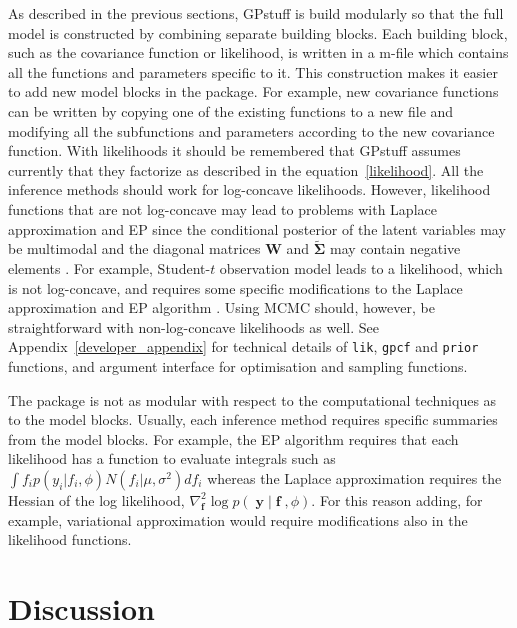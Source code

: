 \documentclass[twoside,11pt]{article}
\DeclareMathOperator{\f}{\mathbf{f}}
\DeclareMathOperator{\y}{\mathbf{y}}
\newcommand{\mb}{\mathbf}
\newcommand{\pkg}[1]{{\fontseries{b}\selectfont #1}}
\newcommand{\code}[1]{{\normalfont\texttt{#1}}}
\begin{document}
As described in the previous sections, \pkg{GPstuff} is build
modularly so that the full model is constructed by combining separate
building blocks. Each building block, such as the covariance function
or likelihood, is written in a m-file which contains
all the functions and parameters specific to it. This construction
makes it easier to add new model blocks in the package. For example, new
covariance functions can be written by copying one of the existing
functions to a new file and modifying all the subfunctions and
parameters according to the new covariance function. With likelihoods
it should be remembered that \pkg{GPstuff} assumes currently that they
factorize as described in the equation~\eqref{likelihood}. All the
inference methods should work for log-concave likelihoods. However,
likelihood functions that are not log-concave may lead to problems
with Laplace approximation and EP since the conditional posterior of
the latent variables may be multimodal and the diagonal matrices
$\mb{W}$ and $\tilde{\mb{\Sigma}}$ may contain negative elements
\citep{Vanhatalo+Jylanki+Vehtari:2009}. For example, Student-$t$
observation model leads to a likelihood, which is not log-concave, and
requires some specific modifications to the Laplace approximation and
EP algorithm \citep[see][]{Jylanki+Vanhatalo+Vehtari:2011}. Using MCMC
should, however, be straightforward with non-log-concave likelihoods
as well. 
%
See Appendix~\ref{developer_appendix} for technical details of
\code{lik}, \code{gpcf} and \code{prior} functions, and argument
interface for optimisation and sampling functions.

The package is not as modular with respect to the computational
techniques as to the model blocks. Usually, each inference method
requires specific summaries from the model blocks. For example, the EP
algorithm requires that each likelihood has a function to evaluate
integrals such as $\int f_i p(y_i|f_i,\phi) N(f_i|\mu,\sigma^2) df_i$
whereas the Laplace approximation requires the Hessian of the log
likelihood, $\nabla^2_{\f} \log p(\y|\f,\phi)$.  For this reason
adding, for example, variational approximation would require
modifications also in the likelihood functions.

\section{Discussion}
\end{document}

